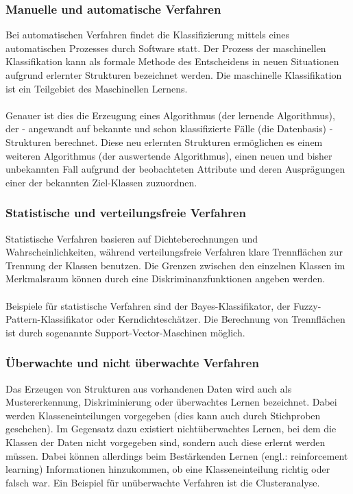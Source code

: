 \subsubsection{Manuelle und automatische Verfahren}
Bei automatischen Verfahren findet die Klassifizierung mittels eines automatischen Prozesses durch Software statt. Der Prozess der maschinellen Klassifikation kann als formale Methode des Entscheidens in neuen Situationen aufgrund erlernter Strukturen bezeichnet werden. Die maschinelle Klassifikation ist ein Teilgebiet des Maschinellen Lernens.\\
\\
Genauer ist dies die Erzeugung eines Algorithmus (der lernende Algorithmus), der - angewandt auf bekannte und schon klassifizierte Fälle (die Datenbasis) - Strukturen berechnet. Diese neu erlernten Strukturen ermöglichen es einem weiteren Algorithmus (der auswertende Algorithmus), einen neuen und bisher unbekannten Fall aufgrund der beobachteten Attribute und deren Ausprägungen einer der bekannten Ziel-Klassen zuzuordnen.

\subsubsection{Statistische und verteilungsfreie Verfahren}
Statistische Verfahren basieren auf Dichteberechnungen und Wahrscheinlichkeiten, während verteilungsfreie Verfahren klare Trennflächen zur Trennung der Klassen benutzen. Die Grenzen zwischen den einzelnen Klassen im Merkmalsraum können durch eine Diskriminanzfunktionen angeben werden.\\
\\
Beispiele für statistische Verfahren sind der Bayes-Klassifikator, der Fuzzy-Pattern-Klassifikator oder Kerndichteschätzer. Die Berechnung von Trennflächen ist durch sogenannte Support-Vector-Maschinen möglich.

\subsubsection{Überwachte und nicht überwachte Verfahren}
Das Erzeugen von Strukturen aus vorhandenen Daten wird auch als Mustererkennung, Diskriminierung oder überwachtes Lernen bezeichnet. Dabei werden Klasseneinteilungen vorgegeben (dies kann auch durch Stichproben geschehen). Im Gegensatz dazu existiert nichtüberwachtes Lernen, bei dem die Klassen der Daten nicht vorgegeben sind, sondern auch diese erlernt werden müssen. Dabei können allerdings beim Bestärkenden Lernen (engl.: reinforcement learning) Informationen hinzukommen, ob eine Klasseneinteilung richtig oder falsch war. Ein Beispiel für unüberwachte Verfahren ist die Clusteranalyse.

